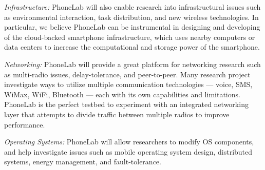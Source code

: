 \iffalse
One of the authors, Murat Demirbas, is currently doing a project in this category, that uses smartphones to collect time-activity data for pollutant exposure estimation. PhoneLab would provide a realistic experimentation platform for this research.
\fi

\emph{Infrastructure:} PhoneLab will also enable research into infrastructural
issues such as environmental interaction, task distribution, and new wireless
technologies. In particular, we believe PhoneLab can be instrumental in designing and developing of the cloud-backed smartphone infrastructure, which uses nearby computers or data centers to increase the computational and storage power of the smartphone.


\emph{Networking:} PhoneLab will provide a great platform for networking
research such as multi-radio issues, delay-tolerance, and peer-to-peer.
Many research project investigate ways to utilize multiple communication
technologies --- voice, SMS, WiMax, WiFi, Bluetooth --- each with its own
capabilities and limitations. PhoneLab is the perfect testbed to experiment
with an integrated networking layer that attempts to divide traffic between
multiple radios to improve performance.

\emph{Operating Systems:} PhoneLab will allow researchers to modify OS
components, and help investigate issues such as mobile operating system
design, distributed systems, energy management, and fault-tolerance.



